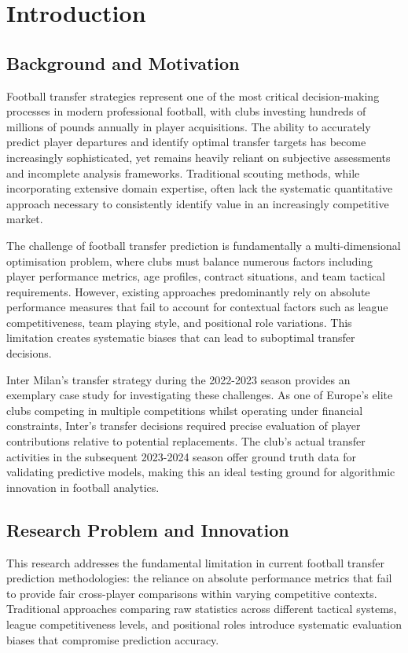 \section{Introduction}

\subsection{Background and Motivation}

Football transfer strategies represent one of the most critical decision-making processes in modern professional football, with clubs investing hundreds of millions of pounds annually in player acquisitions. The ability to accurately predict player departures and identify optimal transfer targets has become increasingly sophisticated, yet remains heavily reliant on subjective assessments and incomplete analysis frameworks. Traditional scouting methods, while incorporating extensive domain expertise, often lack the systematic quantitative approach necessary to consistently identify value in an increasingly competitive market.

The challenge of football transfer prediction is fundamentally a multi-dimensional optimisation problem, where clubs must balance numerous factors including player performance metrics, age profiles, contract situations, and team tactical requirements. However, existing approaches predominantly rely on absolute performance measures that fail to account for contextual factors such as league competitiveness, team playing style, and positional role variations. This limitation creates systematic biases that can lead to suboptimal transfer decisions.

Inter Milan's transfer strategy during the 2022-2023 season provides an exemplary case study for investigating these challenges. As one of Europe's elite clubs competing in multiple competitions whilst operating under financial constraints, Inter's transfer decisions required precise evaluation of player contributions relative to potential replacements. The club's actual transfer activities in the subsequent 2023-2024 season offer ground truth data for validating predictive models, making this an ideal testing ground for algorithmic innovation in football analytics.

\subsection{Research Problem and Innovation}

This research addresses the fundamental limitation in current football transfer prediction methodologies: the reliance on absolute performance metrics that fail to provide fair cross-player comparisons within varying competitive contexts. Traditional approaches comparing raw statistics across different tactical systems, league competitiveness levels, and positional roles introduce systematic evaluation biases that compromise prediction accuracy.

